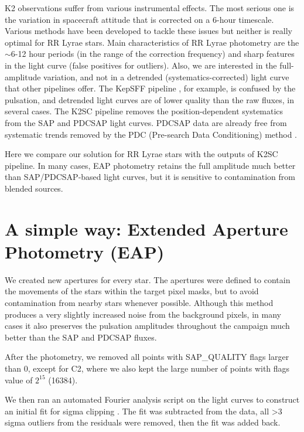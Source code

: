 \documentclass[epj,twocolumn]{webofc}
\begin{document}
K2 observations suffer from various instrumental effects. The most serious one is the variation in spacecraft attitude that is corrected on a 6-hour timescale. Various methods have been developed to tackle these issues but neither is really optimal for RR Lyrae stars. Main characteristics of RR Lyrae photometry are the $\sim$6-12 hour periods (in the range of the correction frequency) and sharp features in the light curve (false positives for outliers). Also, we are interested in the full-amplitude variation, and not in a detrended (systematics-corrected) light curve that other pipelines offer. The KepSFF pipeline \cite{van}, for example, is confused by the pulsation, and detrended light curves are of lower quality than the raw fluxes, in several cases. The K2SC pipeline \cite{k2sc} removes the position-dependent systematics from the SAP and PDCSAP light curves. PDCSAP data are already free from systematic trends removed by the PDC (Pre-search Data Conditioning) method \cite{pdc}.

Here we compare our solution for RR Lyrae stars with the outputs of K2SC pipeline. In many cases, EAP photometry retains the full amplitude much better than SAP/PDCSAP-based light curves, but it is sensitive to contamination from blended sources.


\section{A simple way: Extended Aperture Photometry (EAP)}
\label{sec-1}

We created new apertures for every star. The apertures were defined to contain the movements of the stars within the target pixel masks, but to avoid contamination from nearby stars whenever possible. Although this method produces a very slightly increased noise from the background pixels, in many cases it also preserves the pulsation amplitudes throughout the campaign much better than the SAP and PDCSAP fluxes. 

After the photometry, we removed all points with SAP\_QUALITY flags larger than 0, except for C2, where we also kept the large number of points with flags value of $2^{15}$ (16384). 

We then ran an automated Fourier analysis script on the light curves to construct an initial fit for sigma clipping \cite{sodor}. The fit was subtracted from the data, all >3 sigma outliers from the residuals were removed, then the fit was added back.
\end{document}
